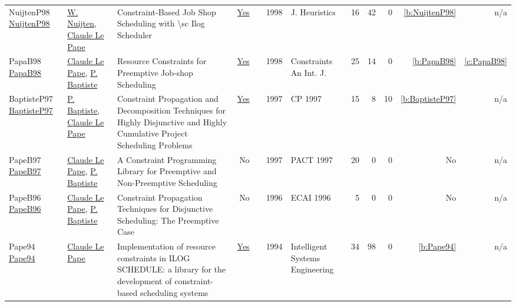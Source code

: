 {\begin{longtable}{>{\raggedright\arraybackslash}p{3cm}>{\raggedright\arraybackslash}p{6cm}>{\raggedright\arraybackslash}p{6.5cm}rrrp{2.5cm}rrrrr}
NuijtenP98 \href{https://doi.org/10.1023/A:1009687210594}{NuijtenP98} & \hyperref[auth:a662]{W. Nuijten}, \hyperref[auth:a164]{Claude Le Pape} & Constraint-Based Job Shop Scheduling with {\textbackslash}sc Ilog Scheduler & \href{../works/NuijtenP98.pdf}{Yes} & \cite{NuijtenP98} & 1998 & J. Heuristics & 16 & 42 & 0 & \ref{b:NuijtenP98} & n/a\\
PapaB98 \href{https://doi.org/10.1023/A:1009723704757}{PapaB98} & \hyperref[auth:a164]{Claude Le Pape}, \hyperref[auth:a163]{P. Baptiste} & Resource Constraints for Preemptive Job-shop Scheduling & \href{../works/PapaB98.pdf}{Yes} & \cite{PapaB98} & 1998 & Constraints An Int. J. & 25 & 14 & 0 & \ref{b:PapaB98} & \ref{c:PapaB98}\\
BaptisteP97 \href{https://doi.org/10.1007/BFb0017454}{BaptisteP97} & \hyperref[auth:a163]{P. Baptiste}, \hyperref[auth:a164]{Claude Le Pape} & Constraint Propagation and Decomposition Techniques for Highly Disjunctive and Highly Cumulative Project Scheduling Problems & \href{../works/BaptisteP97.pdf}{Yes} & \cite{BaptisteP97} & 1997 & CP 1997 & 15 & 8 & 10 & \ref{b:BaptisteP97} & n/a\\
PapeB97 \href{}{PapeB97} & \hyperref[auth:a164]{Claude Le Pape}, \hyperref[auth:a163]{P. Baptiste} & A Constraint Programming Library for Preemptive and Non-Preemptive Scheduling & No & \cite{PapeB97} & 1997 & PACT 1997 & 20 & 0 & 0 & No & n/a\\
PapeB96 \href{}{PapeB96} & \hyperref[auth:a164]{Claude Le Pape}, \hyperref[auth:a163]{P. Baptiste} & Constraint Propagation Techniques for Disjunctive Scheduling: The Preemptive Case & No & \cite{PapeB96} & 1996 & ECAI 1996 & 5 & 0 & 0 & No & n/a\\
Pape94 \href{http://dx.doi.org/10.1049/ise.1994.0009}{Pape94} & \hyperref[auth:a164]{Claude Le Pape} & Implementation of resource constraints in ILOG SCHEDULE: a library for the development of constraint-based scheduling systems & \href{../works/Pape94.pdf}{Yes} & \cite{Pape94} & 1994 & Intelligent Systems Engineering & 34 & 98 & 0 & \ref{b:Pape94} & n/a\\
\end{longtable}
}

\clearpage
